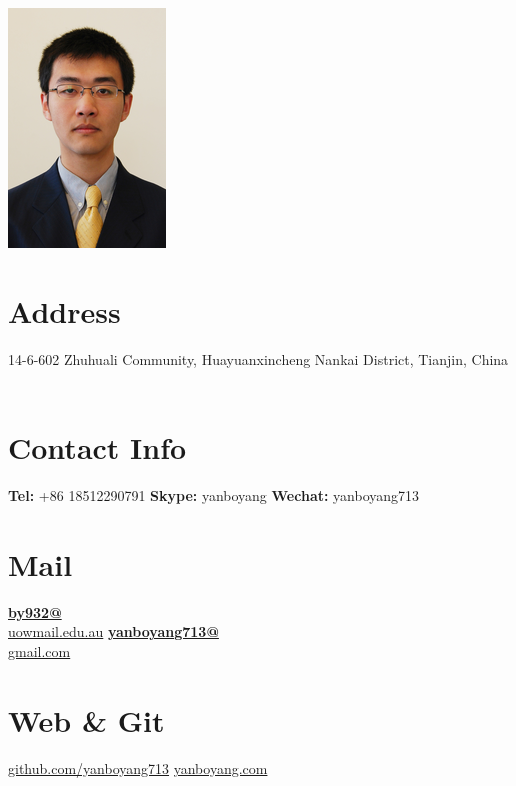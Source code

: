 \documentclass[]{friggeri-cv}
\begin{document}

     

\begin{aside}
  \includegraphics[scale=0.07]{img/boyang.png}
  \section{Address}
  14-6-602 Zhuhuali Community, Huayuanxincheng
  Nankai District,  Tianjin,
  China
    ~
  \section{Contact Info}
  \textbf{Tel:} +86 18512290791
    \textbf{Skype:} yanboyang
    \textbf{Wechat:} yanboyang713
    ~
  \section{Mail}
    \href{mailto:by932@uowmail.edu.au}{\textbf{by932@}\\uowmail.edu.au}
    \href{mailto:yanboyang713@gmail.com}{\textbf{yanboyang713@}\\gmail.com}
    ~
  \section{Web \& Git}
    \href{https://github.com/yanboyang713}{github.com/yanboyang713}
    \href{http://www.yanboyang.com}{yanboyang.com}
    ~

\end{aside}
\end{document}
